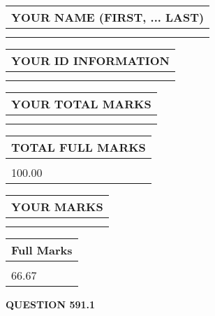 \documentclass{ctexart}
\begin{document}
   
   
   
\newpage 
\setcounter{page}{ 
   591001 } 
   
   
   
   
\noindent\begin{tabular}{|l|}
\hline
YOUR NAME (FIRST, ... LAST)  \\
\hline
 \\ 
 \\ 
\hline
\end{tabular}
\hspace{0.05in} \begin{tabular}{|l|}
\hline
 YOUR   ID   INFORMATION  \\
\hline
 \\ 
 \\ 
\hline
\end{tabular}
   
   
\vspace{0.2in}\noindent\begin{tabular}{|l|}
\hline
YOUR TOTAL MARKS  \\
\hline
 \\ 
 \\ 
\hline
\end{tabular}
\hspace{0.05in} \begin{tabular}{|l|}
\hline
TOTAL FULL MARKS  \\
\hline
 \\ 
100.00 \\
\hline
\end{tabular}
   
   
 \vspace{0.2in}
 
 
 
 
   
   
  
\vspace{0.2in}
  
\noindent\begin{tabular}{|l|}
\hline
 YOUR MARKS  \\
\hline
 \\ 
 \\ 
\hline
\end{tabular}
\hspace{0.05in} \begin{tabular}{|l|}
\hline
 Full Marks  \\
\hline
 \\ 
66.67 \\
\hline
\end{tabular}
{\textbf{\Large{QUESTION
591.1 
}}}
  
\end{document}
